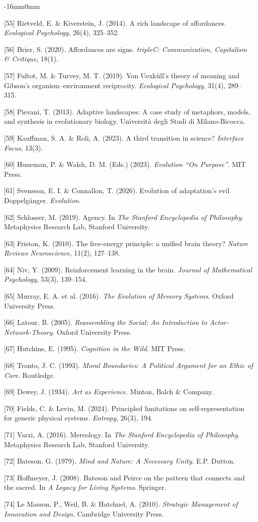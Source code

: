 \documentclass[10pt,oneside]{book}
\newcommand{\refentry}[1]{%
  \par\addvspace{0pt}%
  \begingroup\footnotesize\linespread{0.92}\selectfont
  \noindent\hangindent=4mm\hangafter=1 #1\par%
  \endgroup
}
\newenvironment{widebody}{%
  \begin{adjustwidth}{-16mm}{0mm}%
}{%
  \end{adjustwidth}%
}
\begin{document}
\begin{widebody}
\refentry{[55] Rietveld, E. \& Kiverstein, J. (2014). A rich landscape of affordances. \textit{Ecological Psychology}, 26(4), 325--352.}
\refentry{[56] Brier, S. (2020). Affordances are signs. \textit{tripleC: Communication, Capitalism \& Critique}, 18(1).}
\refentry{[57] Fultot, M. \& Turvey, M. T. (2019). Von Uexküll's theory of meaning and Gibson's organism--environment reciprocity. \textit{Ecological Psychology}, 31(4), 289--315.}
\refentry{[58] Pievani, T. (2013). Adaptive landscapes: A case study of metaphors, models, and synthesis in evolutionary biology. Università degli Studi di Milano-Bicocca.}
\refentry{[59] Kauffman, S. A. \& Roli, A. (2023). A third transition in science? \textit{Interface Focus}, 13(3).}
\refentry{[60] Huneman, P. \& Walsh, D. M. (Eds.) (2023). \textit{Evolution ``On Purpose''}. MIT Press.}
\refentry{[61] Svensson, E. I. \& Connallon, T. (2026). Evolution of adaptation's evil Doppelgänger. \textit{Evolution}.}
\refentry{[62] Schlosser, M. (2019). Agency. In \textit{The Stanford Encyclopedia of Philosophy}. Metaphysics Research Lab, Stanford University.}
\refentry{[63] Friston, K. (2010). The free-energy principle: a unified brain theory? \textit{Nature Reviews Neuroscience}, 11(2), 127--138.}
\refentry{[64] Niv, Y. (2009). Reinforcement learning in the brain. \textit{Journal of Mathematical Psychology}, 53(3), 139--154.}
\refentry{[65] Murray, E. A. et al. (2016). \textit{The Evolution of Memory Systems}. Oxford University Press.}
\refentry{[66] Latour, B. (2005). \textit{Reassembling the Social: An Introduction to Actor-Network-Theory}. Oxford University Press.}
\refentry{[67] Hutchins, E. (1995). \textit{Cognition in the Wild}. MIT Press.}
\refentry{[68] Tronto, J. C. (1993). \textit{Moral Boundaries: A Political Argument for an Ethic of Care}. Routledge.}
\refentry{[69] Dewey, J. (1934). \textit{Art as Experience}. Minton, Balch \& Company.}
\refentry{[70] Fields, C. \& Levin, M. (2024). Principled limitations on self-representation for generic physical systems. \textit{Entropy}, 26(3), 194.}
\refentry{[71] Varzi, A. (2016). Mereology. In \textit{The Stanford Encyclopedia of Philosophy}. Metaphysics Research Lab, Stanford University.}
\refentry{[72] Bateson, G. (1979). \textit{Mind and Nature: A Necessary Unity}. E.P. Dutton.}
\refentry{[73] Hoffmeyer, J. (2008). Bateson and Peirce on the pattern that connects and the sacred. In \textit{A Legacy for Living Systems}. Springer.}
\refentry{[74] Le Masson, P., Weil, B. \& Hatchuel, A. (2010). \textit{Strategic Management of Innovation and Design}. Cambridge University Press.}

\end{widebody}
\end{document}
